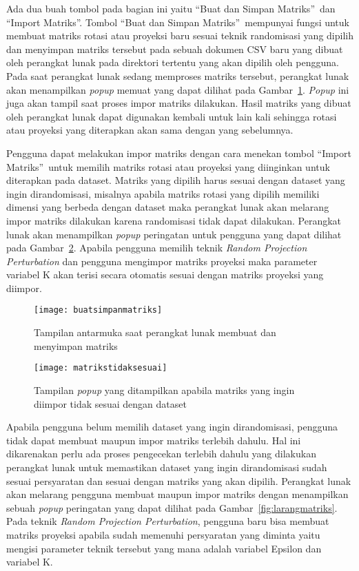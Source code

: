 Ada dua buah tombol pada bagian ini yaitu \textquotedblleft Buat dan Simpan Matriks\textquotedblright~dan \textquotedblleft Import Matriks\textquotedblright. Tombol \textquotedblleft Buat dan Simpan Matriks\textquotedblright~mempunyai fungsi untuk membuat matriks rotasi atau proyeksi baru sesuai teknik randomisasi yang dipilih dan menyimpan matriks tersebut pada sebuah dokumen CSV baru yang dibuat oleh perangkat lunak pada direktori tertentu yang akan dipilih oleh pengguna. Pada saat perangkat lunak sedang memproses matriks tersebut, perangkat lunak akan menampilkan \textit{popup} memuat yang dapat dilihat pada Gambar~\ref{fig:buatsimpanmatriks}. \textit{Popup} ini juga akan tampil saat proses impor matriks dilakukan. Hasil matriks yang dibuat oleh perangkat lunak dapat digunakan kembali untuk lain kali sehingga rotasi atau proyeksi yang diterapkan akan sama dengan yang sebelumnya. 

Pengguna dapat melakukan impor matriks dengan cara menekan tombol \textquotedblleft Import Matriks\textquotedblright~untuk memilih matriks rotasi atau proyeksi yang diinginkan untuk diterapkan pada dataset. Matriks yang dipilih harus sesuai dengan dataset yang ingin dirandomisasi, misalnya apabila matriks rotasi yang dipilih memiliki dimensi yang berbeda dengan dataset maka perangkat lunak akan melarang impor matriks dilakukan karena randomisasi tidak dapat dilakukan. Perangkat lunak akan menampilkan \textit{popup} peringatan untuk pengguna yang dapat dilihat pada Gambar~\ref{fig:matrikstidaksesuai}. Apabila pengguna memilih teknik \textit{Random Projection Perturbation} dan pengguna mengimpor matriks proyeksi maka parameter variabel K akan terisi secara otomatis sesuai dengan matriks proyeksi yang diimpor.

\begin{figure}
	\centering
	\texttt{[image: buatsimpanmatriks]}
	\caption{Tampilan antarmuka saat perangkat lunak membuat dan menyimpan matriks}
	\label{fig:buatsimpanmatriks}
\end{figure}

\begin{figure}
	\centering
	\texttt{[image: matrikstidaksesuai]}
	\caption{Tampilan \textit{popup} yang ditampilkan apabila matriks yang ingin diimpor tidak sesuai dengan dataset}
	\label{fig:matrikstidaksesuai}
\end{figure}

Apabila pengguna belum memilih dataset yang ingin dirandomisasi, pengguna tidak dapat membuat maupun impor matriks terlebih dahulu. Hal ini dikarenakan perlu ada proses pengecekan terlebih dahulu yang dilakukan perangkat lunak untuk memastikan dataset yang ingin dirandomisasi sudah sesuai persyaratan dan sesuai dengan matriks yang akan dipilih. Perangkat lunak akan melarang pengguna membuat maupun impor matriks dengan menampilkan sebuah \textit{popup} peringatan yang dapat dilihat pada Gambar~\ref{fig:larangmatriks}. Pada teknik \textit{Random Projection Perturbation}, pengguna baru bisa membuat matriks proyeksi apabila sudah memenuhi persyaratan yang diminta yaitu mengisi parameter teknik tersebut yang mana adalah variabel Epsilon dan variabel K.

